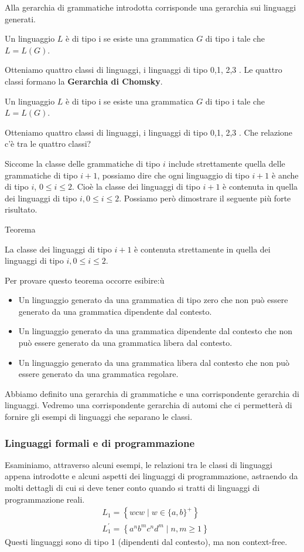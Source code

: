 Alla gerarchia di grammatiche introdotta corrisponde una gerarchia sui linguaggi generati.

Un linguaggio $L$ è di tipo i se esiste una grammatica $G$ di tipo i tale che $L=L(G)$.

Otteniamo quattro classi di linguaggi, i linguaggi di tipo 0,1, 2,3 . Le quattro classi formano la
\textbf{Gerarchia di Chomsky}.

\vspace{5mm}

Un linguaggio $L$ è di tipo i se esiste una grammatica $G$ di tipo i tale che $L=L(G)$.

Otteniamo quattro classi di linguaggi, i linguaggi di tipo 0,1, 2,3 .
Che relazione c'è tra le quattro classi?

Siccome la classe delle grammatiche di tipo $i$ include strettamente quella delle grammatiche di tipo $i+1$, possiamo dire che ogni linguaggio di tipo $i+1$ è anche di tipo $i$, $0 \leq i \leq 2$.
Cioè la classe dei linguaggi di tipo $i+1$ è contenuta in quella dei linguaggi di tipo $i, 0 \leq i \leq 2$.
Possiamo però dimostrare il seguente più forte risultato.

\vspace{5mm}

Teorema

La classe dei linguaggi di tipo $i+1$ è contenuta strettamente in quella dei linguaggi di tipo $i, 0 \leq i \leq 2$.

Per provare questo teorema occorre esibire:ù
\begin{itemize}
    \item Un linguaggio generato da una grammatica di tipo zero che
non può essere generato da una grammatica dipendente dal
contesto.
    \item  Un linguaggio generato da una grammatica dipendente dal
contesto che non può essere generato da una grammatica
libera dal contesto.
    \item Un linguaggio generato da una grammatica libera dal contesto
che non può essere generato da una grammatica regolare.
\end{itemize}
Abbiamo definito una gerarchia di grammatiche e una
corrispondente gerarchia di linguaggi.
Vedremo una corrispondente gerarchia di automi che ci
permetterà di fornire gli esempi di linguaggi che separano le
classi.

\subsubsection{Linguaggi formali e di programmazione}
Esaminiamo, attraverso alcuni esempi, le relazioni tra le classi di linguaggi appena introdotte e alcuni aspetti dei linguaggi di programmazione, astraendo da molti dettagli di cui si deve tener conto quando si tratti di linguaggi di programmazione reali.
$$
\begin{aligned}
&L_{1}=\left\{w c w \mid w \in\{a, b\}^{+}\right\} \\
&L_{1}^{\prime}=\left\{a^{n} b^{m} c^{n} d^{m} \mid n, m \geq 1\right\}
\end{aligned}
$$
Questi linguaggi sono di tipo 1 (dipendenti dal contesto), ma non context-free.

